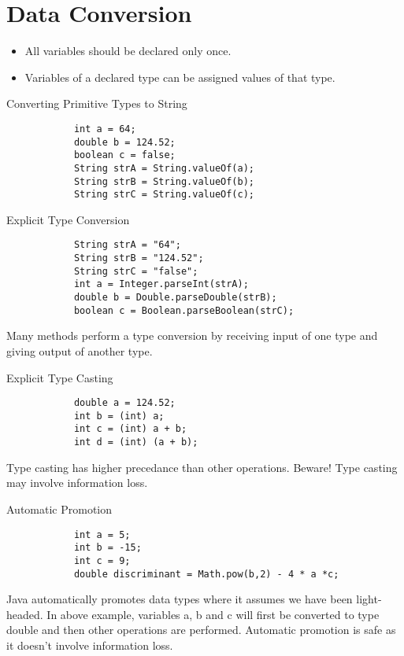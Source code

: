 \documentclass[10pt, compress]{beamer}
\begin{document}
\section{Data Conversion}

\begin{slide}
	\begin{itemize}
		\item[] All variables should be declared only once.
		\item[] Variables of a declared type can be assigned values of that type.
	\end{itemize}
	\begin{block}{Converting Primitive Types to String}
		\begin{verbatim}
			int a = 64;
			double b = 124.52;
			boolean c = false;
			String strA = String.valueOf(a);
			String strB = String.valueOf(b);
			String strC = String.valueOf(c);
		\end{verbatim}
	\end{block}
\end{slide}

\begin{slide}
	\begin{block}{Explicit Type Conversion}
		\begin{verbatim}
			String strA = "64";
			String strB = "124.52";
			String strC = "false";
			int a = Integer.parseInt(strA);
			double b = Double.parseDouble(strB);
			boolean c = Boolean.parseBoolean(strC);
		\end{verbatim}
		Many methods perform a type conversion by receiving input of one type and giving output of another type.
	\end{block}
\end{slide}

\begin{slide}
	\begin{block}{Explicit Type Casting}
		\begin{verbatim}
			double a = 124.52;
			int b = (int) a;
			int c = (int) a + b;
			int d = (int) (a + b);
		\end{verbatim}
		Type casting has higher precedance than other operations. Beware! Type casting may involve information loss.
	\end{block}
\end{slide}

\begin{slide}
	\begin{block}{Automatic Promotion}
		\begin{verbatim}
			int a = 5;
			int b = -15;
			int c = 9;
			double discriminant = Math.pow(b,2) - 4 * a *c;
		\end{verbatim}
		Java automatically promotes data types where it assumes we have been light-headed. In above example, variables a, b and c will first be converted to type double and then other operations are performed. Automatic promotion is safe as it doesn't involve information loss.
	\end{block}
\end{slide}

\end{document}
